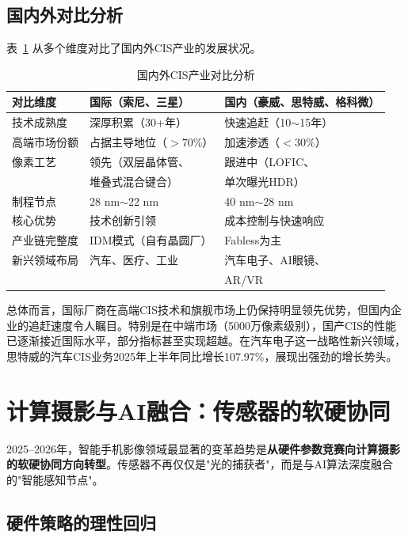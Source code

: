 \documentclass[12pt, a4paper]{ctexart}
\begin{document}
\subsection{国内外对比分析}

表~\ref{tab:cn_vs_intl} 从多个维度对比了国内外CIS产业的发展状况。

\begin{table}[H]
\centering
\caption{国内外CIS产业对比分析}
\label{tab:cn_vs_intl}
\small
\begin{tabular}{lll}
\toprule
\textbf{对比维度} & \textbf{国际（索尼、三星）} & \textbf{国内（豪威、思特威、格科微）} \\
\midrule
技术成熟度 & 深厚积累（30+年） & 快速追赶（10$\sim$15年） \\
高端市场份额 & 占据主导地位（$>$70\%） & 加速渗透（$<$30\%） \\
像素工艺 & 领先（双层晶体管、 & 跟进中（LOFIC、 \\
 & 堆叠式混合键合） & 单次曝光HDR） \\
制程节点 & 28 nm$\sim$22 nm & 40 nm$\sim$28 nm \\
核心优势 & 技术创新引领 & 成本控制与快速响应 \\
产业链完整度 & IDM模式（自有晶圆厂） & Fabless为主 \\
新兴领域布局 & 汽车、医疗、工业 & 汽车电子、AI眼镜、 \\
 & & AR/VR \\
\bottomrule
\end{tabular}
\end{table}

总体而言，国际厂商在高端CIS技术和旗舰市场上仍保持明显领先优势，但国内企业的追赶速度令人瞩目。特别是在中端市场（5000万像素级别），国产CIS的性能已逐渐接近国际水平，部分指标甚至实现超越。在汽车电子这一战略性新兴领域，思特威的汽车CIS业务2025年上半年同比增长107.97\%\cite{qqCIS2025}，展现出强劲的增长势头。


\section{计算摄影与AI融合：传感器的软硬协同}

2025--2026年，智能手机影像领域最显著的变革趋势是\textbf{从硬件参数竞赛向计算摄影的软硬协同方向转型}\cite{itbear2026}。传感器不再仅仅是"光的捕获者"，而是与AI算法深度融合的"智能感知节点"。

\subsection{硬件策略的理性回归}
\end{document}
